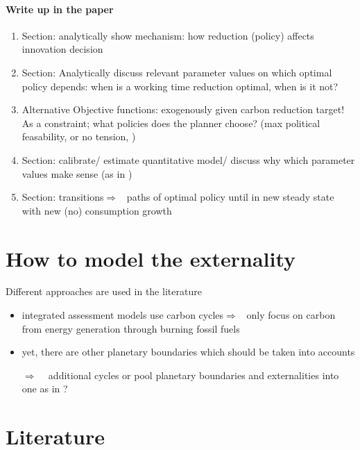 \documentclass[12pt]{article}
\newcommand{\ar}{$\Rightarrow$ \ }
\begin{document}
\paragraph{Write up in the paper}
\begin{enumerate}
\item Section: analytically show mechanism: how reduction (policy) affects innovation decision
\item Section: Analytically discuss relevant parameter values on which optimal policy depends: when is a working time reduction optimal, when is it not?
\item Alternative Objective functions: exogenously given carbon reduction target! As a constraint; what policies does the planner choose? (max political feasability, or no tension, )
\item Section: calibrate/ estimate quantitative model/ discuss why which parameter values make sense (as in \cite{Jones2016LifeGrowth, Fried2018ClimateAnalysis})
\item Section: transitions\ar paths of optimal policy until in new steady state with new (no) consumption growth
\end{enumerate} 

\section{How to model the externality}
Different approaches are used in the literature
\begin{itemize}
\item integrated assessment models use carbon cycles\ar only focus on carbon from energy generation through burning fossil fuels
\item yet, there are other planetary boundaries \citep{Rockstrom2009AHumanity} which should be taken into accounts
\item[\ar] additional cycles or pool planetary boundaries and externalities into one as in \cite{Dasgupta2021}?
\end{itemize}

\section{Literature}
\end{document}
